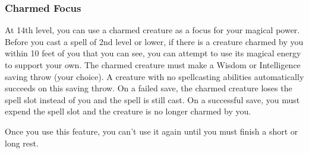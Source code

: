\subsubsection{Charmed Focus}

At 14th level, you can use a charmed creature as a focus for your magical power. Before you cast a spell of 2nd level or lower, if there is a creature charmed by you within 10 feet of you that you can see, you can attempt to use its magical energy to support your own. The charmed creature must make a Wisdom or Intelligence saving throw (your choice). A creature with no spellcasting abilities automatically succeeds on this saving throw. On a failed save, the charmed creature loses the spell slot instead of you and the spell is still cast. On a successful save, you must expend the spell slot and the creature is no longer charmed by you.

Once you use this feature, you can't use it again until you must finish a short or long rest.



